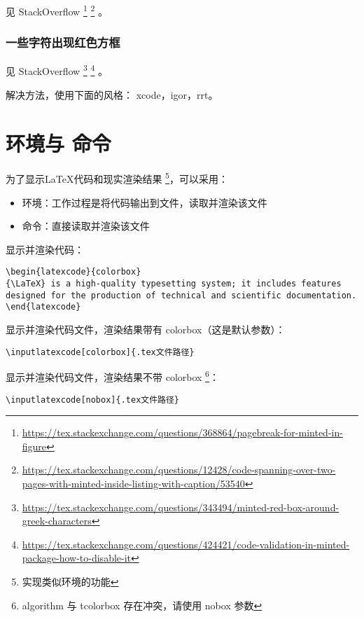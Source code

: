 见 StackOverflow
\footnote{\url{https://tex.stackexchange.com/questions/368864/pagebreak-for-minted-in-figure}}
\footnote{\url{https://tex.stackexchange.com/questions/12428/code-spanning-over-two-pages-with-minted-inside-listing-with-caption/53540}}
。

\subsubsection{一些字符出现红色方框}

见 StackOverflow
\footnote{\url{https://tex.stackexchange.com/questions/343494/minted-red-box-around-greek-characters}}
\footnote{\url{https://tex.stackexchange.com/questions/424421/code-validation-in-minted-package-how-to-disable-it}}
。

解决方法，使用下面的风格：
xcode，igor，rrt。

\section{\protect{} 环境与 \protect{} 命令}

为了显示{\LaTeX}代码和现实渲染结果
\footnote{实现类似环境的功能}，可以采用：
\begin{itemize}
  \item {} 环境：工作过程是将代码输出到文件，读取并渲染该文件
  \item {} 命令：直接读取并渲染该文件
\end{itemize}

显示并渲染代码：

\begin{verbatim}
\begin{latexcode}{colorbox}
{\LaTeX} is a high-quality typesetting system; it includes features designed for the production of technical and scientific documentation.
\end{latexcode}
\end{verbatim}

显示并渲染代码文件，渲染结果带有 colorbox（这是默认参数）：

\begin{verbatim}
\inputlatexcode[colorbox]{.tex文件路径}
\end{verbatim}

显示并渲染代码文件，渲染结果不带 colorbox
\footnote{algorithm 与 tcolorbox 存在冲突，请使用 nobox 参数}：

\begin{verbatim}
\inputlatexcode[nobox]{.tex文件路径}
\end{verbatim}
